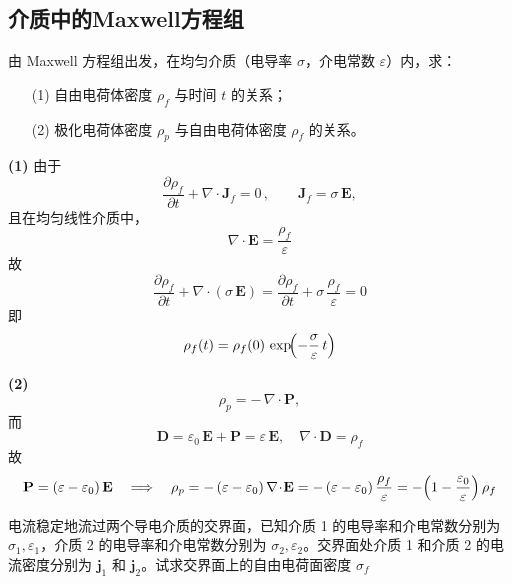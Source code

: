 \documentclass{template}
\begin{document}
\subsection{介质中的Maxwell方程组}
\begin{problem}
    由 Maxwell 方程组出发，在均匀介质（电导率 $\sigma$，介电常数 $\varepsilon$）内，求：
\begin{enumerate}
  \item[(1)] 自由电荷体密度 $\rho_f$ 与时间 $t$ 的关系；
  \item[(2)] 极化电荷体密度 $\rho_p$ 与自由电荷体密度 $\rho_f$ 的关系。
\end{enumerate}
\end{problem}
\begin{solution}
\item[\textbf{(1)}] 由于
\begin{equation}
\frac{\partial \rho_f}{\partial t} + \nabla\!\cdot\!\mathbf J_f = 0
\,,\qquad
\mathbf J_f = \sigma\,\mathbf E,
\end{equation}
且在均匀线性介质中，
\begin{equation}
\nabla\!\cdot\!\mathbf E = \frac{\rho_f}{\varepsilon} 
\end{equation}
故
\begin{equation}
\frac{\partial \rho_f}{\partial t}
+ \nabla\!\cdot(\sigma\,\mathbf E)
= \frac{\partial \rho_f}{\partial t}
+ \sigma\,\frac{\rho_f}{\varepsilon}
=0 
\end{equation}
即
\begin{equation}
\rho_f(t)
= \rho_f(0)\,\exp\!\Bigl(-\frac{\sigma}{\varepsilon}\,t\Bigr) 
\end{equation}
\item[\textbf{(2)}] 
\begin{equation}
\rho_p = -\,\nabla\!\cdot\!\mathbf P,
\end{equation}
而
\begin{equation}
\mathbf D = \varepsilon_0\,\mathbf E + \mathbf P
= \varepsilon\,\mathbf E,
\quad
\nabla\!\cdot\!\mathbf D = \rho_f 
\end{equation}
故
\begin{equation}
\mathbf P = (\varepsilon - \varepsilon_0)\,\mathbf E
\quad\Longrightarrow\quad
\rho_p
= -\,(\varepsilon - \varepsilon_0)\,\nabla\!\cdot\!\mathbf E
= -\,(\varepsilon - \varepsilon_0)\,\frac{\rho_f}{\varepsilon}
= -\Bigl(1 - \frac{\varepsilon_0}{\varepsilon}\Bigr)\,\rho_f 
\end{equation}
\end{solution}
\begin{problem}
    电流稳定地流过两个导电介质的交界面，已知介质 1 的电导率和介电常数分别为 \(\sigma_1,\varepsilon_1\)，介质 2 的电导率和介电常数分别为 \(\sigma_2,\varepsilon_2\)。交界面处介质 1 和介质 2 的电流密度分别为 \(\mathbf j_1\) 和 \(\mathbf j_2\)。试求交界面上的自由电荷面密度 \(\sigma_f\) 
\end{problem}
\end{document}
